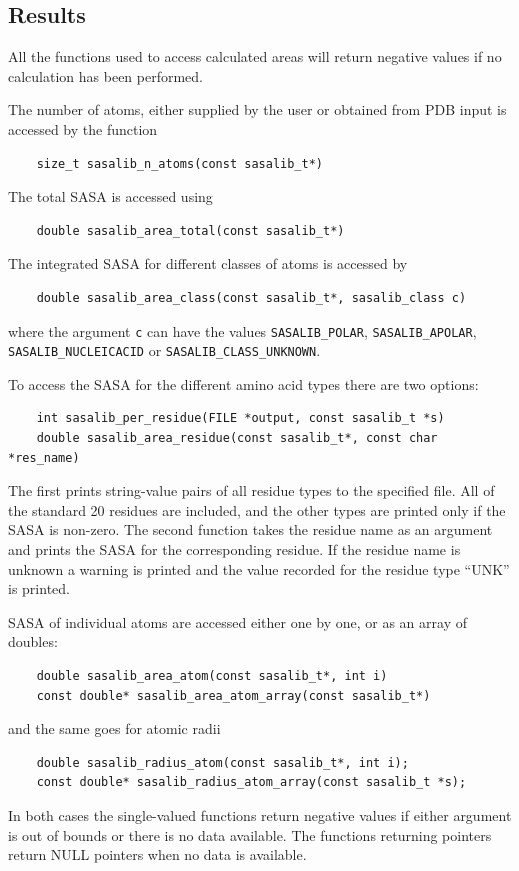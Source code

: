 \documentclass[a4paper,11pt]{article}
\begin{document}
\subsection{Results}

All the functions used to access calculated areas will return negative
values if no calculation has been performed.

The number of atoms, either supplied by the user or obtained from PDB input
is accessed by the function
\begin{verbatim}
    size_t sasalib_n_atoms(const sasalib_t*)
\end{verbatim}
The total SASA is accessed using
\begin{verbatim}
    double sasalib_area_total(const sasalib_t*)
\end{verbatim}
The integrated SASA for different classes of atoms is accessed by
\begin{verbatim}
    double sasalib_area_class(const sasalib_t*, sasalib_class c)
\end{verbatim}
where the argument \verb|c| can have the values \verb|SASALIB_POLAR|, 
\verb|SASALIB_APOLAR|, \verb|SASALIB_NUCLEICACID| or 
\verb|SASALIB_CLASS_UNKNOWN|.

To access the SASA for the different amino acid types there are two
options:
\begin{verbatim}
    int sasalib_per_residue(FILE *output, const sasalib_t *s)
    double sasalib_area_residue(const sasalib_t*, const char *res_name)
\end{verbatim}
The first prints string-value pairs of all residue types to the
specified file. All of the standard 20 residues are included, and the
other types are printed only if the SASA is non-zero.  The second
function takes the residue name as an argument and prints the SASA for
the corresponding residue. If the residue name is unknown a warning is
printed and the value recorded for the residue type ``UNK'' is
printed.

SASA of individual atoms are accessed either one by one, or
as an array of doubles:
\begin{verbatim}
    double sasalib_area_atom(const sasalib_t*, int i)
    const double* sasalib_area_atom_array(const sasalib_t*)
\end{verbatim}
and the same goes for atomic radii
\begin{verbatim}
    double sasalib_radius_atom(const sasalib_t*, int i);
    const double* sasalib_radius_atom_array(const sasalib_t *s);
\end{verbatim}
In both cases the single-valued functions return negative values if
either argument is out of bounds or there is no data available. The
functions returning pointers return NULL pointers when no data is
available.
\end{document}
